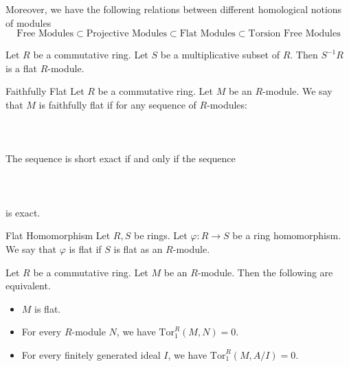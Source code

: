 \documentclass[a4paper]{article}
\begin{document}
Moreover, we have the following relations between different homological notions of modules $$\text{Free Modules}\subset\text{Projective Modules}\subset\text{Flat Modules}\subset\text{Torsion Free Modules}$$

\begin{prp}{}{} Let $R$ be a commutative ring. Let $S$ be a multiplicative subset of $R$. Then $S^{-1}R$ is a flat $R$-module. 
\end{prp}

\begin{defn}{Faithfully Flat}{} Let $R$ be a commutative ring. Let $M$ be an $R$-module. We say that $M$ is faithfully flat if for any sequence of $R$-modules: \\~\\
\\~\\
The sequence is short exact if and only if the sequence\\~\\
\\~\\
is exact. 
\end{defn} 

\begin{defn}{Flat Homomorphism}{} Let $R,S$ be rings. Let $\varphi:R\to S$ be a ring homomorphism. We say that $\varphi$ is flat if $S$ is flat as an $R$-module. 
\end{defn}

\begin{prp}{}{} Let $R$ be a commutative ring. Let $M$ be an $R$-module. Then the following are equivalent. 
\begin{itemize}
\item $M$ is flat. 
\item For every $R$-module $N$, we have $\text{Tor}_1^R(M,N)=0$. 
\item For every finitely generated ideal $I$, we have $\text{Tor}_1^R(M,A/I)=0$. 
\end{itemize}
\end{prp}
\end{document}

